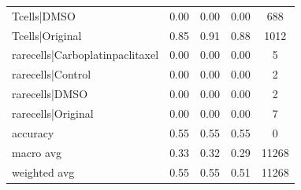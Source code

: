 \begin{table}[htbp]
\begin{tabular}{lcccc}
Tcells|DMSO & 0.00 & 0.00 & 0.00 & 688 \\
Tcells|Original & 0.85 & 0.91 & 0.88 & 1012 \\
rarecells|Carboplatinpaclitaxel & 0.00 & 0.00 & 0.00 & 5 \\
rarecells|Control & 0.00 & 0.00 & 0.00 & 2 \\
rarecells|DMSO & 0.00 & 0.00 & 0.00 & 2 \\
rarecells|Original & 0.00 & 0.00 & 0.00 & 7 \\
accuracy & 0.55 & 0.55 & 0.55 & 0 \\
macro avg & 0.33 & 0.32 & 0.29 & 11268 \\
weighted avg & 0.55 & 0.55 & 0.51 & 11268 \\
\end{tabular}
\end{table}
